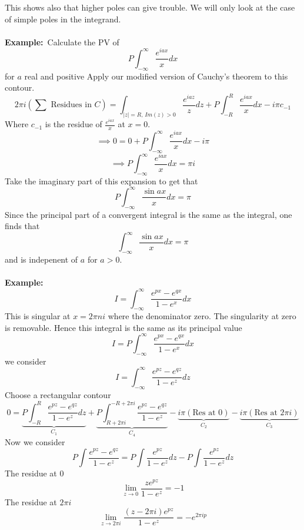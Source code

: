 \documentclass{article}
\newcommand{\example}{\textbf{Example:}}
\newcommand{\improp}{\int_{-\infty}^{\infty} } %
\begin{document}
This shows also that higher poles can give trouble. We will only look at the case
of simple poles in the integrand.
\\
\\
\example\ Calculate the PV of 
\[ P \int_{-\infty}^{\infty} \frac{e^{iax}}{x} dx \]
for $a$ real and positive
Apply our modified version of Cauchy's theorem to this contour.
\[ 2\pi i \left( \sum \mbox{ Residues in } C \right)  = 
\int_{|z| = R, \, Im(z) >0} \frac{e^{iaz}}{z}dz +
P \int_{-R}^{R} \frac{e^{iax}}{x} dx - i\pi c_{-1} \]
Where $c_{-1}$ is the residue of $\frac{e^{iax}}{x}$ at $x=0$.
\[ \implies 0 = 0 + P\int_{-\infty}^{\infty} \frac{e^{iax}}{x} dx - i \pi \]
\[ \implies P\int_{-\infty}^{\infty} \frac{e^{iax}}{x} dx = \pi i \]
Take the imaginary part of this expansion to get that
\[ P \int_{-\infty}^{\infty} \frac{\sin ax}{x} dx = \pi\]
Since the principal part of a convergent integral is the same
as the integral, one finds that
\[ \int_{-\infty}^{\infty} \frac{\sin ax}{x} dx = \pi \] and is indepenent
of $a$ for $a>0$.
\\
\\
\example\
\begin{equation}
I = \improp \frac{e^{px} - e^{qx}}{1 - e^x} dx \tag{$0 < p,q < 1$}
\end{equation}
This is singular at $x = 2 \pi n i$ where the denominator zero. The
singularity at zero is removable. Hence this integral is the same as its
principal value 
\[I = P\improp \frac{e^{px} - e^{qx}}{1 - e^x} dx  \]
we consider 
\[I = \improp \frac{e^{pz} - e^{qz}}{1 - e^z} dz  \]
Choose a rectangular contour
\[ 0 = \underbrace{P\int^{R}_{-R} \frac{e^{pz} - e^{qz}}{1 - e^z} dz}_{C_1}
+ \underbrace{P \int^{-R+2\pi i}_{R+2\pi i} \frac{e^{pz} - e^{qz}}{1 - e^z} }_{C_4}
-\underbrace{i\pi \left( \mbox{Res at } 0 \right)}_{C_2}
-\underbrace{i\pi \left( \mbox{Res at } 2\pi i \right)}_{C_3} \]
Now we consider
\[ P \int \frac{e^{pz} - e^{qz}}{1-e^z} = P\int \frac{e^{pz}}{1-e^z} dz - 
P \int \frac{e^{pz}}{1-e^z} dz \]
The residue at 0
\[ \lim_{z \to 0} \frac{z e^{pz}}{1- e^z} = -1 \]
The residue at $2\pi i$
\[ \lim_{z \to 2 \pi i} \frac{(z - 2 \pi i)e^{pz}}{1- e^z} = -e^{2 \pi i p} \]
\end{document}
